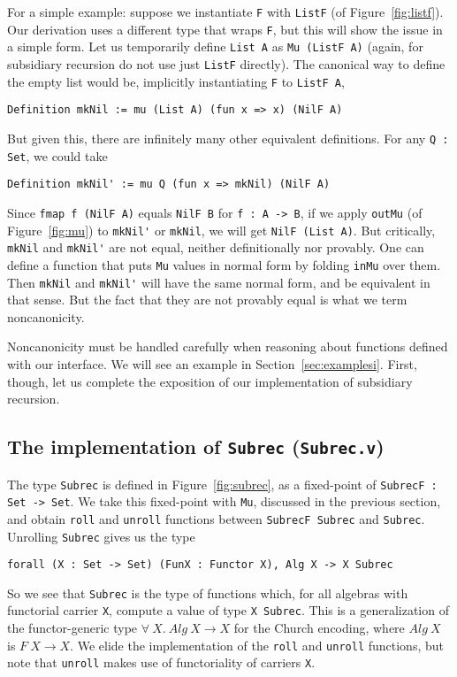 \documentclass[a4paper,USenglish]{lipics-v2021}
\begin{document}
For a simple example: suppose we instantiate \verb|F| with
\verb|ListF| (of Figure~\ref{fig:listf}).  Our derivation uses a
different type that wraps \verb|F|, but this will show the issue in a
simple form.  Let us temporarily define \verb|List A| as
\verb|Mu (ListF A)| (again, for subsidiary recursion do not use just
\verb|ListF| directly).  The canonical way to define the empty list
would be, implicitly instantiating \verb|F| to \verb|ListF A|,
\begin{verbatim}
Definition mkNil := mu (List A) (fun x => x) (NilF A)
\end{verbatim}
\noindent But given this, there are infinitely many other equivalent
definitions.  For any \verb|Q : Set|, we could take
\begin{verbatim}
Definition mkNil' := mu Q (fun x => mkNil) (NilF A)
\end{verbatim}
\noindent Since \verb|fmap f (NilF A)| equals \verb|NilF B| for
\verb|f : A -> B|, if we apply \verb|outMu| (of Figure~\ref{fig:mu})
to \verb|mkNil'| or \verb|mkNil|, we will get \verb|NilF (List A)|.
But critically, \verb|mkNil| and \verb|mkNil'| are not equal, neither
definitionally nor provably.  One can define a function that puts
\verb|Mu| values in normal form by folding \verb|inMu| over them.
Then \verb|mkNil| and \verb|mkNil'| will have the same normal form,
and be equivalent in that sense.  But the fact that they are not
provably equal is what we term noncanonicity.

Noncanonicity must be handled carefully when reasoning about functions
defined with our interface.  We will see an example in
Section~\ref{sec:examplesi}.  First, though, let us complete the
exposition of our implementation of subsidiary recursion.

\subsection{The implementation of \texttt{Subrec} (\texttt{Subrec.v})}
\label{sec:subrecimpl}

The type \verb|Subrec| is defined in Figure~\ref{fig:subrec}, as a
fixed-point of \verb|SubrecF : Set -> Set|.  We take this fixed-point
with \verb|Mu|, discussed in the previous section, and obtain \verb|roll|
and \verb|unroll| functions between \verb|SubrecF Subrec| and \verb|Subrec|.
Unrolling \verb|Subrec| gives us the type
\begin{verbatim}
forall (X : Set -> Set) (FunX : Functor X), Alg X -> X Subrec
\end{verbatim}
\noindent So we see that \verb|Subrec| is the type of functions which,
for all algebras with functorial carrier
\verb|X|, compute a value of type \verb|X Subrec|.  This is a
generalization of the functor-generic type
$\forall\ X.\ \textit{Alg}\ X \to X$ for the Church encoding, where
$\textit{Alg}\ X$ is $F\ X \to X$.  We elide the implementation of the
\verb|roll| and \verb|unroll| functions, but note that \verb|unroll|
makes use of functoriality of carriers \verb|X|.
\end{document}
